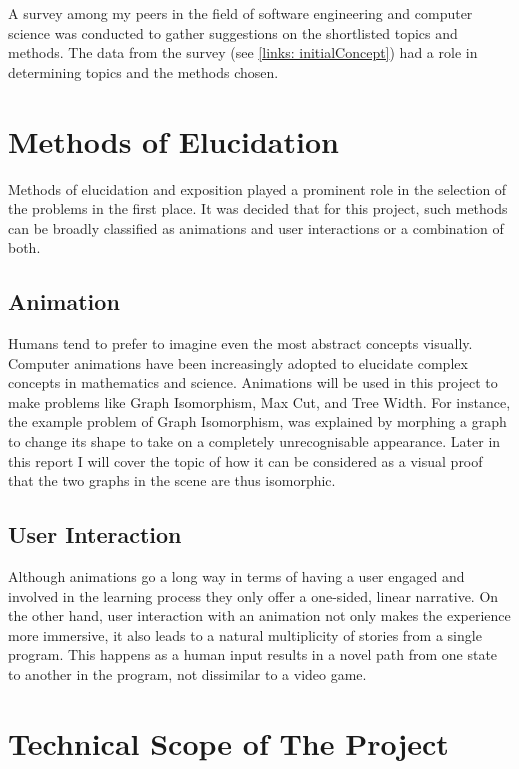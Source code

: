 A survey among my
peers in the field of software engineering and computer science was conducted to 
gather suggestions on the shortlisted topics and methods.
The data from the survey (see \autoref{links: initialConcept}) had a role in determining topics and the methods chosen.


\section{Methods of Elucidation}
Methods of elucidation and exposition played a prominent role in the selection of the problems
in the first place. It was decided that for this project, such methods can be
broadly classified as animations and user interactions or a combination of
both.


\subsection{Animation}

Humans tend to prefer to imagine even the most abstract concepts visually.
Computer animations have been increasingly adopted to elucidate complex
concepts in mathematics and science.  Animations will be used in this project to
make problems like Graph Isomorphism, Max Cut, and Tree Width.  For instance,
the example problem of Graph Isomorphism, was explained by morphing a graph to
change its shape to take on a completely unrecognisable appearance. Later in this report I will cover the topic of how it can be considered as a visual proof that the two graphs
in the scene are thus isomorphic.

\subsection{User Interaction}
Although animations go a long way in terms of having a user engaged and involved in
the learning process they only offer a one-sided, linear narrative. On the other hand,
user interaction with an animation not only makes the experience more
immersive, it also leads to a natural multiplicity of stories from a single
program. This happens as a human input results in a novel path from one state
to another in the program, not dissimilar to a video game.

\section{Technical Scope of The Project}
\label{requirements: techScope}

